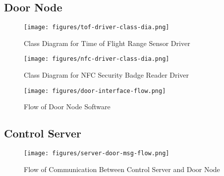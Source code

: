 \subsection{Door Node}

\begin{figure}[!htb]
\centering
\texttt{[image: figures/tof-driver-class-dia.png]}
\caption{Class Diagram for Time of Flight Range Sensor Driver}
\end{figure}

\begin{figure}[!htb]
\centering
\texttt{[image: figures/nfc-driver-class-dia.png]}
\caption{Class Diagram for NFC Security Badge Reader Driver}
\end{figure}

\begin{figure}[!htb]
\centering
\texttt{[image: figures/door-interface-flow.png]}
\caption{Flow of Door Node Software}
\end{figure}

\subsection{Control Server}

\begin{figure}[!htb]
\centering
\texttt{[image: figures/server-door-msg-flow.png]}
\caption{Flow of Communication Between Control Server and Door Node}
\end{figure}


